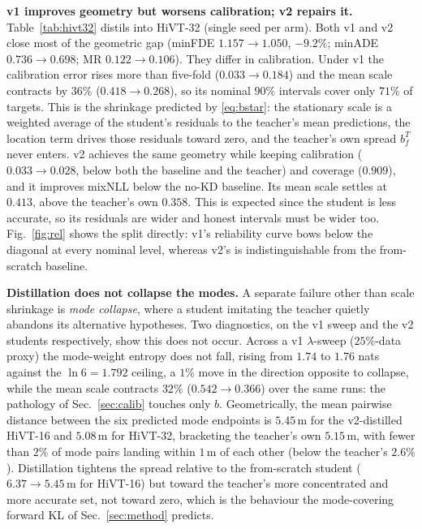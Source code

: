 \documentclass[conference]{IEEEtran}
\newcommand{\scale}{b}
\begin{document}
\textbf{v1 improves geometry but worsens calibration; v2 repairs it.}
Table~\ref{tab:hivt32} distils into HiVT-32 (single seed per arm). Both v1 and
v2 close most of the geometric gap (minFDE $1.157\to1.050$, $-9.2\%$; minADE
$0.736\to0.698$; MR $0.122\to0.106$). They differ in calibration. Under v1 the
calibration error rises more than five-fold ($0.033\to0.184$) and the mean scale
contracts by $36\%$ ($0.418\to0.268$), so its nominal $90\%$ intervals cover only
$71\%$ of targets. This is the shrinkage predicted by \eqref{eq:bstar}: the
stationary scale is a weighted average of the student's residuals to the
teacher's mean predictions, the location term drives those residuals toward
zero, and the teacher's own spread $\scale^T_f$ never enters. v2 achieves the
same geometry while keeping calibration ($0.033\to0.028$, below both the
baseline and the teacher) and coverage ($0.909$), and it improves mixNLL below
the no-KD baseline. Its mean scale settles at $0.413$, above the teacher's own
$0.358$. This is expected since the student is less accurate, so its residuals are wider
and honest intervals must be wider too. Fig.~\ref{fig:rel} shows the split directly: v1's reliability curve bows below the
diagonal at every nominal level, whereas v2's is indistinguishable from the
from-scratch baseline.

\textbf{Distillation does not collapse the modes.} A separate failure other than
scale shrinkage is \emph{mode collapse}, where a student imitating the teacher
quietly abandons its alternative hypotheses. Two diagnostics, on the v1 sweep 
and the v2 students respectively, show this does not occur. Across a v1
$\lambda$-sweep ($25\%$-data proxy) the mode-weight entropy does not fall,
rising from $1.74$ to $1.76$ nats against the $\ln 6 = 1.792$ ceiling, a $1\%$
move in the direction opposite to collapse, while the mean scale contracts
$32\%$ ($0.542\to0.366$) over the same runs: the pathology of
Sec.~\ref{sec:calib} touches only $\scale$. Geometrically, the mean pairwise
distance between the six predicted mode endpoints is $5.45$\,m for the
v2-distilled HiVT-16 and $5.08$\,m for HiVT-32, bracketing the teacher's own
$5.15$\,m, with fewer than $2\%$ of mode pairs landing within $1$\,m of each
other (below the teacher's $2.6\%$). Distillation tightens the spread relative
to the from-scratch student ($6.37\to5.45$\,m for HiVT-16) but toward the
teacher's more concentrated and more accurate set, not toward zero, which is the
behaviour the mode-covering forward KL of Sec.~\ref{sec:method} predicts.
\end{document}
